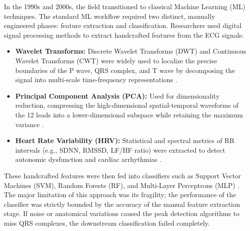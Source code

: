 \documentclass[12pt,a4paper]{report}
\begin{document}
In the 1990s and 2000s, the field transitioned to classical Machine Learning (ML) techniques. The standard ML workflow required two distinct, manually engineered phases: feature extraction and classification. Researchers used digital signal processing methods to extract handcrafted features from the ECG signals:
\begin{itemize}
    \item \textbf{Wavelet Transforms:} Discrete Wavelet Transforms (DWT) and Continuous Wavelet Transforms (CWT) were widely used to localize the precise boundaries of the P wave, QRS complex, and T wave by decomposing the signal into multi-scale time-frequency representations \cite{clifford2017af}.
    \item \textbf{Principal Component Analysis (PCA):} Used for dimensionality reduction, compressing the high-dimensional spatial-temporal waveforms of the 12 leads into a lower-dimensional subspace while retaining the maximum variance \cite{ismail2019deep}.
    \item \textbf{Heart Rate Variability (HRV):} Statistical and spectral metrics of RR intervals (e.g., SDNN, RMSSD, LF/HF ratio) were extracted to detect autonomic dysfunction and cardiac arrhythmias \cite{moody2001impact}.
\end{itemize}
These handcrafted features were then fed into classifiers such as Support Vector Machines (SVM), Random Forests (RF), and Multi-Layer Perceptrons (MLP) \cite{kachuee2018ecg}. The major limitation of this approach was its fragility; the performance of the classifier was strictly bounded by the accuracy of the manual feature extraction stage. If noise or anatomical variations caused the peak detection algorithms to miss QRS complexes, the downstream classification failed completely.
\end{document}
